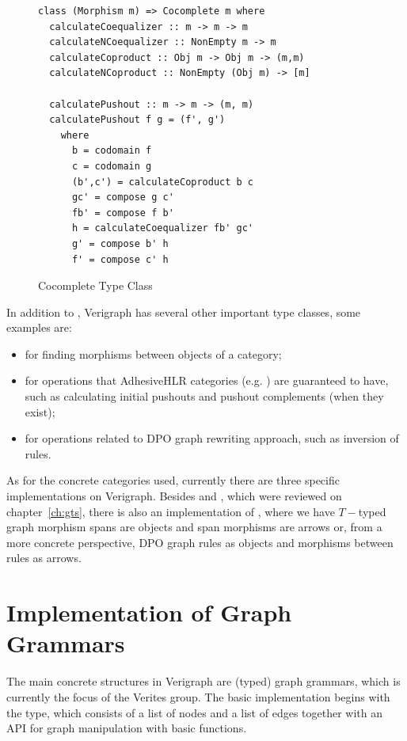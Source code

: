\begin{figure}[!ht]
  \begin{verbatim}
class (Morphism m) => Cocomplete m where
  calculateCoequalizer :: m -> m -> m
  calculateNCoequalizer :: NonEmpty m -> m
  calculateCoproduct :: Obj m -> Obj m -> (m,m)
  calculateNCoproduct :: NonEmpty (Obj m) -> [m]

  calculatePushout :: m -> m -> (m, m)
  calculatePushout f g = (f', g')
    where
      b = codomain f
      c = codomain g
      (b',c') = calculateCoproduct b c
      gc' = compose g c'
      fb' = compose f b'
      h = calculateCoequalizer fb' gc'
      g' = compose b' h
      f' = compose c' h
\end{verbatim}
\caption{Cocomplete Type Class}\label{fig:verigraph:cocomplete-type-class}
\end{figure}

In addition to , Verigraph has several other important type classes, some examples are:
\begin{itemize}
  \item {} for finding morphisms between objects of a category;
  \item {} for operations that AdhesiveHLR categories (e.g. ) are guaranteed to have, such as calculating initial pushouts and pushout complements (when they exist);
  \item {} for operations related to DPO graph rewriting approach, such as inversion of rules.
\end{itemize}

As for the concrete categories used, currently there are three specific implementations on Verigraph. Besides  and , which were reviewed on chapter~\ref{ch:gts}, there is also an implementation of , where we have $T-$typed graph morphism spans are objects and span morphisms are arrows or, from a more concrete perspective, DPO graph rules as objects and morphisms between rules as arrows.

\section{Implementation of Graph Grammars}

The main concrete structures in Verigraph are (typed) graph grammars, which is currently the focus of the Verites group. The basic implementation begins with the  type, which consists of a list of nodes and a list of edges together with an API for graph manipulation with basic functions.

